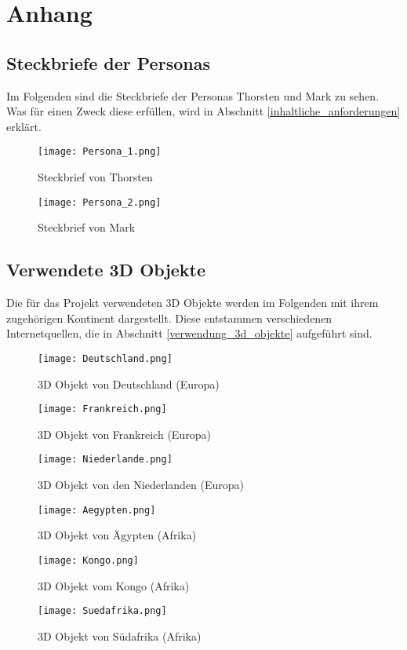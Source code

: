 \chapter{Anhang}\label{app:anhang}
\section{Steckbriefe der Personas}\label{persona}
Im Folgenden sind die Steckbriefe der Personas Thorsten und Mark zu sehen. Was für einen Zweck diese erfüllen, wird in Abschnitt \ref{inhaltliche_anforderungen} erklärt.

\begin{figure}[!htb]
  \texttt{[image: Persona\_1.png]}
  \caption{Steckbrief von Thorsten}\label{fig:persona_thorsten}
\endminipage\hfill
{}
  \texttt{[image: Persona\_2.png]}
  \caption{Steckbrief von Mark}\label{fig:persona_mark}
\endminipage\hfill
\end{figure}

\section{Verwendete 3D Objekte}
Die für das Projekt verwendeten 3D Objekte werden im Folgenden mit ihrem zugehörigen Kontinent dargestellt. Diese entstammen verschiedenen Internetquellen, die in Abschnitt \ref{verwendung_3d_objekte} aufgeführt sind.

\begin{figure}[!htb]
  \texttt{[image: Deutschland.png]}
  \caption{3D Objekt von Deutschland (Europa)}\label{fig:deutschland}
\endminipage\hfill
{}
  \texttt{[image: Frankreich.png]}
  \caption{3D Objekt von Frankreich (Europa)}\label{fig:frankreich}
\endminipage\hfill
\end{figure}

\begin{figure}[!htb]
  \texttt{[image: Niederlande.png]}
  \caption{3D Objekt von den Niederlanden (Europa)}\label{fig:niederlande}
\endminipage\hfill
{}
  \texttt{[image: Aegypten.png]}
  \caption{3D Objekt von Ägypten (Afrika)}\label{fig:aegypten}
\endminipage\hfill
\end{figure}

\begin{figure}[!htb]
  \texttt{[image: Kongo.png]}
  \caption{3D Objekt vom Kongo (Afrika)}\label{fig:kongo}
\endminipage\hfill
{}
  \texttt{[image: Suedafrika.png]}
  \caption{3D Objekt von Südafrika (Afrika)}\label{fig:suedafrika}
\endminipage\hfill
\end{figure}

